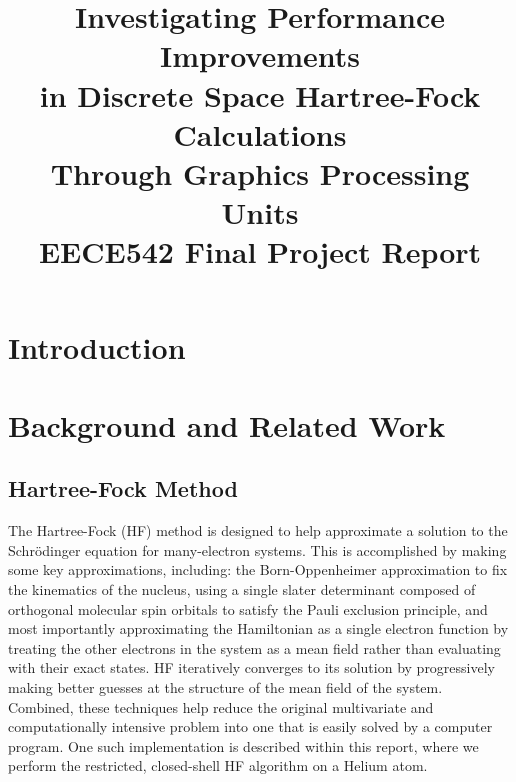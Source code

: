 \documentclass[journal, twoside]{IEEEtran}
\begin{document}

\title{Investigating Performance Improvements\\in Discrete Space Hartree-Fock Calculations\\Through Graphics Processing Units\\{\large EECE542 Final Project Report}}
\author{
}

%
{}
\maketitle

\section{Introduction}

\section{Background and Related Work}

\subsection{Hartree-Fock Method}

The Hartree-Fock (HF) method \cite{szabo-ostlund} is designed to help approximate a solution to the Schr\"{o}dinger equation for many-electron systems. This is accomplished by making some key approximations, including: the Born-Oppenheimer approximation to fix the kinematics of the nucleus, using a single slater determinant composed of orthogonal molecular spin orbitals to satisfy the Pauli exclusion principle, and most importantly approximating the Hamiltonian as a single electron function by treating the other electrons in the system as a mean field rather than evaluating with their exact states. HF iteratively converges to its solution by progressively making better guesses at the structure of the mean field of the system. Combined, these techniques help reduce the original multivariate and computationally intensive problem into one that is easily solved by a computer program. One such implementation is described within this report, where we perform the restricted, closed-shell HF algorithm on a Helium atom.
\end{document}
